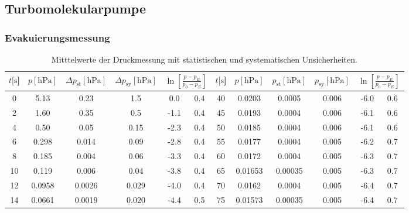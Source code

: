 \subsection{Turbomolekularpumpe}
\subsubsection{Evakuierungsmessung}
\begin{table}[H]
    \centering
      \caption{Mitttelwerte der Druckmessung mit statistischen und systematischen Unsicherheiten.}
      \label{tab:Turbo_Evak}
      \begin{tabular}{
        S[table-format=2.0] S[table-format=1.5] S[table-format=1.5] S[table-format=1.4] S @{${}\pm{}$} S | 
        S[table-format=3.0] S[table-format=1.5] S[table-format=1.5] S[table-format=1.3] S @{${}\pm{}$} S
        }
        \toprule
        {$t [\si{\second}$]} & 
        {$p [\si{\hecto\pascal}]$} & 
        {$\Delta p_\text{st} [\si{\hecto\pascal}]$} & 
        {$\Delta p_\text{sy} [\si{\hecto\pascal}]$} & 
         &
        {$t [\si{\second}$]} & 
        {$p [\si{\hecto\pascal}]$} & 
        {$p_\text{st} [\si{\hecto\pascal}]$} & 
        {$p_\text{sy} [\si{\hecto\pascal}]$} &
         \\
           & 5.13    & 0.23    & 1.5   &  0.0 & 0.4 & 40  & 0.0203  & 0.0005  & 0.006 & -6.0 & 0.6\\
        2   & 1.60    & 0.35    & 0.5   & -1.1 & 0.4 & 45  & 0.0193  & 0.0004  & 0.006 & -6.1 & 0.6\\
        4   & 0.50    & 0.05    & 0.15  & -2.3 & 0.4 & 50  & 0.0185  & 0.0004  & 0.006 & -6.1 & 0.6\\
        6   & 0.298   & 0.014   & 0.09  & -2.8 & 0.4 & 55  & 0.0177  & 0.0004  & 0.005 & -6.2 & 0.7\\
        8   & 0.185   & 0.004   & 0.06  & -3.3 & 0.4 & 60  & 0.0172  & 0.0004  & 0.005 & -6.3 & 0.7\\
        10  & 0.119   & 0.006   & 0.04  & -3.8 & 0.4 & 65  & 0.01653 & 0.00035 & 0.005 & -6.3 & 0.7\\
        12  & 0.0958  & 0.0026  & 0.029 & -4.0 & 0.4 & 70  & 0.0162  & 0.0004  & 0.005 & -6.4 & 0.7\\
        14  & 0.0661  & 0.0019  & 0.020 & -4.4 & 0.5 & 75  & 0.01573 & 0.00035 & 0.005 & -6.4 & 0.7\\

\end{tabular}
\end{table}
